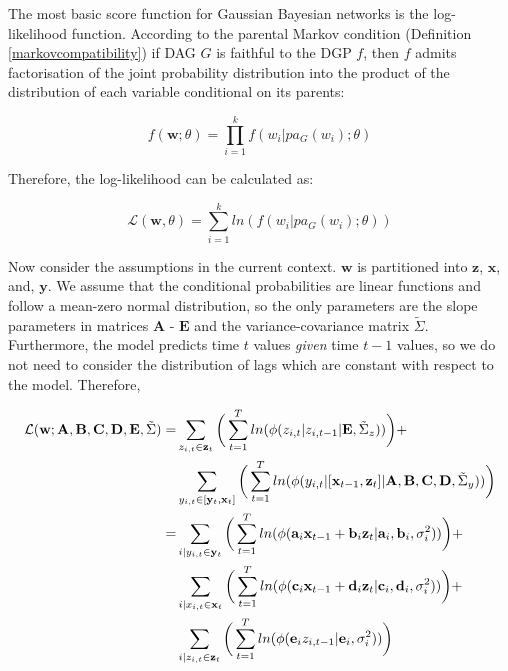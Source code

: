 \documentclass{article}
\begin{document}
The most basic score function for Gaussian Bayesian networks is the log-likelihood function. According to the parental Markov condition (Definition \ref{markovcompatibility}) if DAG $G$ is faithful to the DGP $f$, then $f$ admits factorisation of the joint probability distribution into the product of the distribution of each variable conditional on its parents:

\begin{equation}
  f(\mathbf{w};\theta) = \prod_{i=1}^{k} f(w_i | pa_G(w_i);\theta)
\end{equation}

Therefore, the log-likelihood can be calculated as:

\begin{equation}
  \mathcal{L}(\mathbf{w},\theta) = \sum_{i=1}^{k} ln(f(w_i | pa_G(w_i);\theta))
\end{equation}

Now consider the assumptions in the current context. $\mathbf{w}$ is partitioned into $\mathbf{z}$, $\mathbf{x}$, and, $\mathbf{y}$. We assume that the conditional probabilities are linear functions and follow a mean-zero normal distribution, so the only parameters are the slope parameters in matrices $\mathbf{A}$ - $\mathbf{E}$ and the variance-covariance matrix $\tilde{\Sigma}$. Furthermore, the model predicts time $t$ values \textit{given} time $t-1$ values, so we do not need to consider the distribution of lags which are constant with respect to the model. Therefore,

\begin{align}
  \mathcal{L}(\mathbf{w}; \mathbf{A}, \mathbf{B}, \mathbf{C}, \mathbf{D}, \mathbf{E}, \tilde{\Sigma}) =& \sum_{z_{i,t} \in \mathbf{z}_t} \bigg{(} \sum_{t=1}^{T} ln(\phi(z_{i,t} | z_{i,t-1} | \mathbf{E}, \tilde{\Sigma}_z)) \bigg{)} + \nonumber\\
  & \sum_{y_{i,t} \in [\mathbf{y}_t,\mathbf{x}_t]} \bigg{(} \sum_{t=1}^{T} ln(\phi(y_{i,t} | [\mathbf{x}_{t-1}, \mathbf{z}_{t}] | \mathbf{A}, \mathbf{B}, \mathbf{C}, \mathbf{D}, \tilde{\Sigma}_y)) \bigg{)} \\
  =& \sum_{i | y_{i,t} \in \mathbf{y}_t} \bigg{(} \sum_{t=1}^{T} ln(\phi(\mathbf{a}_i \mathbf{x}_{t-1} + \mathbf{b}_i \mathbf{z}_t | \mathbf{a}_i, \mathbf{b}_i, \sigma_i^2)) \bigg{)} + \nonumber\\
  & \sum_{i | x_{i,t} \in \mathbf{x}_t} \bigg{(} \sum_{t=1}^{T} ln(\phi(\mathbf{c}_i \mathbf{x}_{t-1} + \mathbf{d}_i \mathbf{z}_t | \mathbf{c}_i, \mathbf{d}_i, \sigma_i^2)) \bigg{)} + \nonumber\\
  & \sum_{i | z_{i,t} \in \mathbf{z}_t} \bigg{(} \sum_{t=1}^{T} ln(\phi(\mathbf{e}_i z_{i,t-1}  | \mathbf{e}_i, \sigma_i^2)) \bigg{)}
\end{align}
\end{document}
